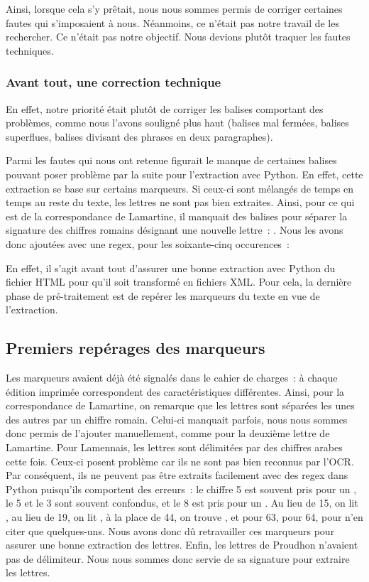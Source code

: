 Ainsi, lorsque cela s'y prêtait, nous nous sommes permis de corriger certaines fautes qui s'imposaient à nous. Néanmoins, ce  n'était pas notre travail de les rechercher. Ce n'était pas notre objectif. Nous devions plutôt traquer les fautes techniques.

\subsubsection{Avant tout, une correction technique}

En effet, notre priorité était plutôt de corriger les balises comportant des problèmes, comme nous l'avons souligné plus haut (balises mal fermées, balises superflues, balises divisant des phrases en deux paragraphes). 

Parmi les fautes qui nous ont retenue figurait le manque de certaines balises pouvant poser problème par la suite pour l'extraction avec Python. En effet, cette extraction se base sur certains marqueurs. Si ceux-ci sont mélangés de temps en temps au reste du texte, les lettres ne sont pas bien extraites. Ainsi, pour ce qui est de la correspondance de Lamartine, il manquait des balises   pour séparer la signature des chiffres romains désignant une nouvelle lettre~: . Nous les avons donc ajoutées avec une regex, pour les soixante-cinq occurences~:  

En effet, il s'agit avant tout d'assurer une bonne extraction avec Python du fichier HTML pour qu'il soit transformé en fichiers XML. Pour cela, la dernière phase de pré-traitement est de repérer les marqueurs du texte en vue de l'extraction.


\subsection{Premiers repérages des marqueurs}

Les marqueurs avaient déjà été signalés dans le cahier de charges~: à chaque édition imprimée correspondent des caractéristiques différentes. Ainsi, pour la correspondance de Lamartine, on remarque que les lettres sont séparées les unes des autres par un chiffre romain. Celui-ci manquait parfois, nous nous sommes donc permis de l'ajouter manuellement, comme pour la deuxième lettre de Lamartine. Pour Lamennais, les lettres sont délimitées par des chiffres arabes cette fois. Ceux-ci posent problème car ils ne sont pas bien reconnus par l'OCR. Par conséquent, ils ne peuvent pas être extraits facilement avec des regex dans Python puisqu'ils comportent des erreurs~: le chiffre 5 est souvent pris pour un , le 5 et le 3 sont souvent confondus, et le 8 est pris pour un . Au lieu de 15, on lit , au lieu de 19, on lit , à la place de 44, on trouve , et  pour 63,  pour 64, pour n'en citer que quelques-uns. Nous avons donc dû retravailler ces marqueurs pour assurer une bonne extraction des lettres. Enfin, les lettres de Proudhon n'avaient pas de délimiteur. Nous nous sommes donc servie de sa signature  pour extraire les lettres.

